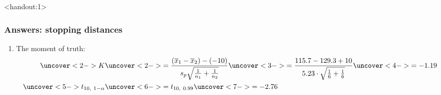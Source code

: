 \documentclass[handout]{beamer}\usepackage{graphicx, color}
\newcommand{\answers}{1}
\providecommand{\ov}[1]{\overline{#1}}
\numberwithin{equation}{section}
\begin{document}
\begin{frame}<handout:\answers>
\frametitle{Answers: stopping distances} \small
\begin{enumerate}[1. ]
 \setcounter{enumi}{\value{saveenum}}
\item The moment of truth:
\begin{align*}
\uncover<2->{K} & \uncover<2->{=  \frac{(\ov{x}_1 - \ov{x}_2) - (-10)}{s_p \sqrt{\frac{1}{n_1} + \frac{1}{n_2}}}}\uncover<3->{ = \frac{115.7 - 129.3 +10 }{5.23 \cdot \sqrt{\frac{1}{6} + \frac{1}{6}}}} \uncover<4->{ = -1.19 }\\
\uncover<5->{t_{10, \ 1 - \alpha}} & \uncover<6->{= t_{10, \ 0.99}} \uncover<7->{ = -2.76}  \\
\end{align*}
\end{enumerate}
\end{frame}
\end{document}
